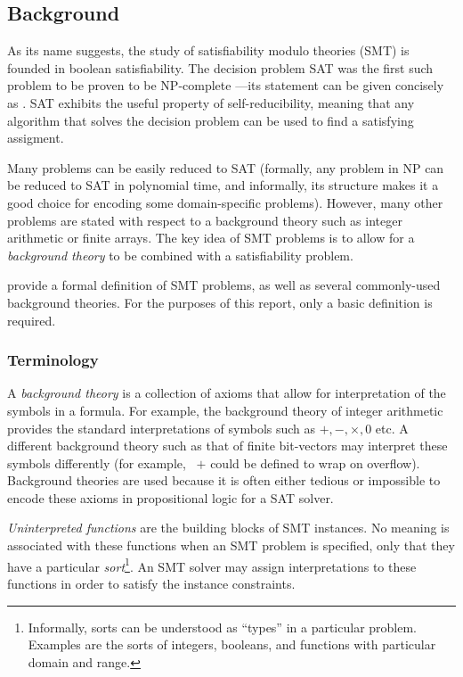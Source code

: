 \subsection{Background}

As its name suggests, the study of satisfiability modulo theories (SMT) is
founded in boolean satisfiability. The decision problem SAT was the first such
problem to be proven to be NP-complete \cite{cook_complexity_1971}---its
statement can be given concisely as . SAT exhibits the useful property of self-reducibility,
meaning that any algorithm that solves the decision problem can be used to find
a satisfying assigment.

Many problems can be easily reduced to SAT (formally, any problem in NP can be
reduced to SAT in polynomial time, and informally, its structure makes it a good
choice for encoding some domain-specific problems). However, many other problems
are stated with respect to a background theory such as integer arithmetic or
finite arrays. The key idea of SMT problems is to allow for a \emph{background
theory} to be combined with a satisfiability problem.

\textcite[ch. 12]{biere_handbook_2009} provide a formal definition of SMT
problems, as well as several commonly-used background theories. For the purposes
of this report, only a basic definition is required.

\subsubsection{Terminology}

A \emph{background theory} is a collection of axioms that allow for
interpretation of the symbols in a formula. For example, the background theory
of integer arithmetic provides the standard interpretations of symbols such as $
+, -, \times, 0 $ etc. A different background theory such as that of finite
bit-vectors may interpret these symbols differently (for example, \ $+$ could be
defined to wrap on overflow). Background theories are used because it is often
either tedious or impossible to encode these axioms in propositional logic for a
SAT solver.

\emph{Uninterpreted functions} are the building blocks of SMT instances. No
meaning is associated with these functions when an SMT problem is specified,
only that they have a particular \emph{sort}\footnote{Informally, sorts can be
understood as ``types'' in a particular problem. Examples are the sorts of
integers, booleans, and functions with particular domain and range.}. An SMT
solver may assign interpretations to these functions in order to satisfy the
instance constraints.

